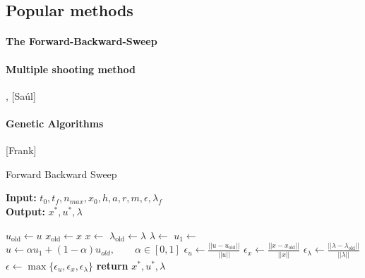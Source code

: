 \subsection{Popular methods}
\paragraph{The Forward-Backward-Sweep}
	\cite{hackbusch1978numerical}
\paragraph{Multiple shooting method}
	\cite*{Pesch1989} , [Saúl]
\paragraph{Genetic Algorithms}
	[Frank]
\begin{algorithm}
	\caption{Forward Backward Sweep } \label{alg:forward_backward_sweep}
    \begin{flushleft}
    	\hspace*{\algorithmicindent} \textbf{Input:} 
    	$t_0, t_f, n_{max}, x_0,h, a, r, m, \epsilon, \lambda_{f}$ \\
    	\hspace*{\algorithmicindent} \textbf{Output:} 
   		$x^*, u^*, \lambda$
   	\end{flushleft}
	\begin{algorithmic}[1]
				\State $u_{\text{old}} \gets u$ 
                \State $x_{\text{old}} \gets x$ 
                \State $ x \gets$
                \State $\lambda_{\text{old}} \gets \lambda $
				\State $\lambda \gets$ 
                \State $u_1 \gets$ 
                \State 
                	$u \gets \alpha u_1 + (1-\alpha)u_{old}, 
                	\qquad \alpha \in [0, 1]$
                \State 
                	$\epsilon_u \gets \displaystyle 
                	\frac{||u - u_{\text{old}}||}{||u||}$
                \State 
                	$\epsilon_x \gets \displaystyle 
                	\frac{||x - x_{\text{old}}||}{||x||}$
                \State 
                	$\epsilon_{\lambda} \gets \displaystyle 
                	\frac{||\lambda - \lambda_{\text{old}}||}{||\lambda||}$
                \State 
                	$\epsilon \gets 
                		\max{ 
                			\{ \epsilon_u, \epsilon_x, \epsilon_{\lambda} \}
                		}$
			\EndWhile\label{}
			\State \textbf{return} $ x^*, u^*, \lambda$
		\EndProcedure
	\end{algorithmic}
\end{algorithm}
